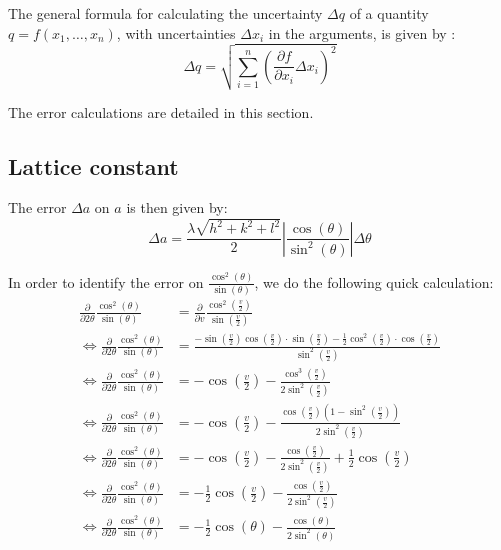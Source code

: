 \documentclass[12pt]{article}
\begin{document}
The general formula for calculating the uncertainty $\Delta q$ of a quantity $q = f(x_1, \dots, x_n)$, with uncertainties $\Delta x_i$ in the arguments, is given by \cite{ErrorPropagation}:
\begin{equation}
    \Delta q = \sqrt{ \sum_{i=1}^n \left( \frac{\partial f}{\partial x_i} \Delta x_i \right)^2}
\end{equation}

The error calculations are detailed in this section.

\subsection{Lattice constant}

The error $\Delta a$ on $a$ is then given by:
\begin{equation}
    \Delta a = \frac{\lambda \sqrt{h^2+k^2+l^2}}{2} \left| \frac{\cos(\theta)}{\sin^2(\theta)}\right| \Delta \theta
\end{equation}

In order to identify the error on $\frac{\cos^2(\theta)}{\sin(\theta)}$, we do the following quick calculation:
\begin{align}
    \frac{\partial}{\partial 2\theta} \frac{\cos^2(\theta)}{\sin(\theta)} &= \frac{\partial}{\partial v} \frac{\cos^2(\frac{v}{2})}{\sin(\frac{v}{2})} \\
    \Leftrightarrow \frac{\partial}{\partial 2\theta} \frac{\cos^2(\theta)}{\sin(\theta)} &= \frac{-\sin(\frac{v}{2})\cos(\frac{v}{2}) \cdot \sin(\frac{v}{2}) - \frac{1}{2} \cos^2(\frac{v}{2}) \cdot \cos(\frac{v}{2})}{\sin^2(\frac{v}{2})} \\
    \Leftrightarrow \frac{\partial}{\partial 2\theta} \frac{\cos^2(\theta)}{\sin(\theta)} &= -\cos(\frac{v}{2}) - \frac{\cos^3(\frac{v}{2})}{2 \sin^2( \frac{v}{2})} \\
    \Leftrightarrow \frac{\partial}{\partial 2\theta} \frac{\cos^2(\theta)}{\sin(\theta)} &= -\cos(\frac{v}{2}) - \frac{\cos(\frac{v}{2})(1-\sin^2(\frac{v}{2}))}{2 \sin^2( \frac{v}{2})} \\
    \Leftrightarrow \frac{\partial}{\partial 2\theta} \frac{\cos^2(\theta)}{\sin(\theta)} &= -\cos(\frac{v}{2}) - \frac{\cos(\frac{v}{2})}{2\sin^2(\frac{v}{2})} + \frac{1}{2} \cos(\frac{v}{2}) \\
    \Leftrightarrow \frac{\partial}{\partial 2\theta} \frac{\cos^2(\theta)}{\sin(\theta)} &= - \frac{1}{2} \cos(\frac{v}{2}) - \frac{\cos(\frac{v}{2})}{2\sin^2(\frac{v}{2})} \\
    \Leftrightarrow \frac{\partial}{\partial 2\theta} \frac{\cos^2(\theta)}{\sin(\theta)} &= - \frac{1}{2} \cos(\theta) - \frac{\cos(\theta)}{2\sin^2(\theta)} \\
\end{align}
\end{document}
